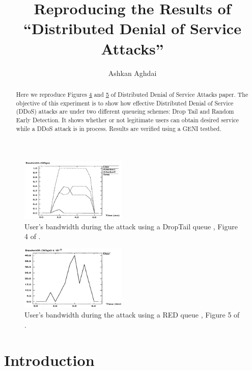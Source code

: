 \documentclass[12pt,twocolumn]{article}
\title{Reproducing the Results of\\``Distributed Denial of Service Attacks''}
\author{Ashkan Aghdai}
\begin{document}
\maketitle

\begin{abstract}

Here we reproduce Figures \hyperref[fig4]{4} and \hyperref[fig5]{5} of Distributed Denial of Service Attacks paper.
The objective of this experiment is to show how effective Distributed Denial of Service (DDoS) attacks are under two different queueing schemes: Drop Tail and Random Early Detection.
It shows whether or not legitimate users can obtain desired service while a DDoS attack is in process.
Results are verified using a GENI testbed.
\end{abstract}

\begin{figure}[b!]
    \centering
    \includegraphics[width=0.45\textwidth]{../Figures/fig4.png} \caption{User's bandwidth during the attack using a DropTail queue \cite{bertsekas1992data}, Figure 4 of \cite{lau2000distributed}.} \label{fig4}
\end{figure}

\begin{figure}[b!]
    \centering
    \includegraphics[width=0.45\textwidth]{../Figures/fig5.png} \caption{User's bandwidth during the attack using a RED queue \cite{floyd1993random}, Figure 5 of \cite{lau2000distributed}.} \label{fig5}
\end{figure}

\section{Introduction}
\end{document}
